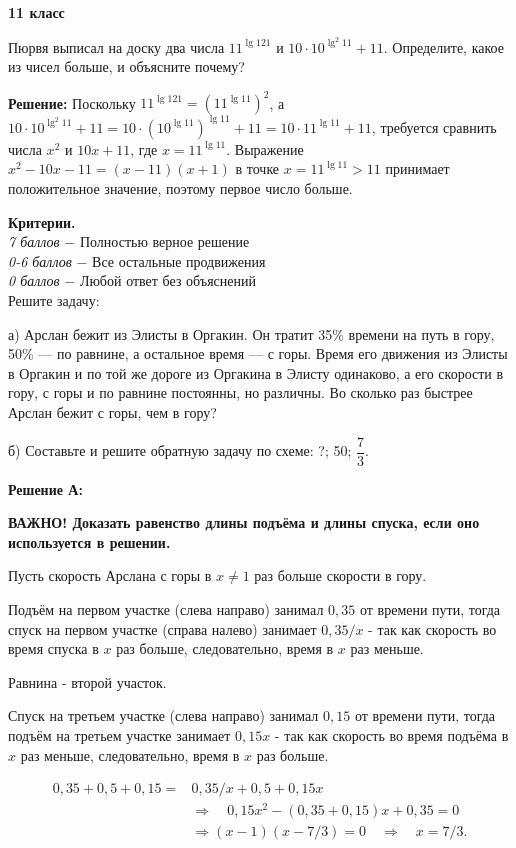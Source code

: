 \centerline{\bf \Large  11 класс}

 Пюрвя выписал на доску два числа $11^{\lg 121}$ и $10 \cdot 10^{\lg ^2 11}+11$. Определите, какое из чисел больше, и объясните почему?

\textbf{Решение:} Поскольку $11^{\lg 121}=\left(11^{\lg 11}\right)^2$, а $10 \cdot 10^{\lg ^2 11}+11=10 \cdot\left(10^{\lg 11}\right)^{\lg 11}+11=10 \cdot 11^{\lg 11}+11$, требуется сравнить числа $x^2$ и $10 x+11$, где $x=11^{\lg 11}$. Выражение $x^2-10 x-11=(x-11)(x+1)$ в точке $x=11^{\lg 11}>11$ принимает положительное значение, поэтому первое число больше.

\textbf{Критерии.} \\
\textit{7 баллов} $-$ Полностью верное решение\\
\textit{0-6 баллов} $-$ Все остальные продвижения\\
\textit{0 баллов} $-$ Любой ответ без объяснений\\

 Решите задачу:

а) Арслан бежит из Элисты в Оргакин. Он тратит 35\% времени на путь в гору, 50\% — по равнине, а остальное время — с горы. Время его движения из Элисты в Оргакин и по той же дороге из Оргакина в Элисту одинаково, а его скорости в гору, с горы и по равнине постоянны, но различны. Во сколько раз быстрее Арслан бежит с горы, чем в гору?


б) Составьте и решите обратную задачу по схеме: ?; 50; $\dfrac{7}{3}$.

\textbf{Решение А:}

\textbf{ВАЖНО! Доказать равенство длины подъёма и длины спуска, если оно используется в решении.}

Пусть скорость Арслана с горы в $x \neq 1$ раз больше скорости в гору.

Подъём на первом участке (слева направо) занимал $0,35$ от времени пути, тогда спуск на первом участке (справа налево) занимает $0,35 / x$ - так как скорость во время спуска в $x$ раз больше, следовательно, время в $x$ раз меньше.

Равнина - второй участок.

Спуск на третьем участке (слева направо) занимал $0,15$ от времени пути, тогда подъём на третьем участке занимает $0,15 x$ - так как скорость во время подъёма в $x$ раз меньше, следовательно, время в $x$ раз больше.

$$
\begin{aligned}
0,35+0,5+0,15= & 0,35 / x+0,5+0,15 x \quad \\
& \Rightarrow \quad 0,15 x^2-(0,35+0,15) x+0,35=0 \\
& \Rightarrow(x-1)(x-7 / 3)=0 \quad \Rightarrow \quad x=7 / 3 .
\end{aligned}
$$


